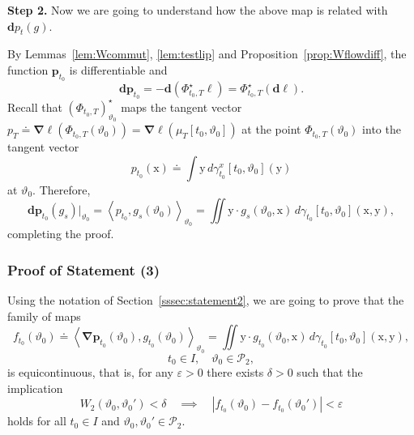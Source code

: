 \documentclass[sn-mathphys-num]{sn-jnl}
\numberwithin{equation}{section}
\theoremstyle{mythm}
\theoremstyle{mydef}
\renewcommand{\d}{\,d}
\renewcommand{\mathbf}[1]{\bm{#1}}
\begin{document}
\textbf{Step 2.} Now we are going to understand how the above map is related with \( \mathbf{d}p_t(g) \).

By Lemmas~\ref{lem:Wcommut}, \ref{lem:testlip} and Proposition~\ref{prop:Wflowdiff}, the function \( \mathbf{p}_{t_0} \) is differentiable and
  \[
    \mathbf{d}\mathbf{p}_{t_0} = - \mathbf{d}\left(\Phi_{t_0,T}^{\star}\ell\right) = \Phi_{t_0,T}^{\star}(\mathbf{d}\ell).
  \]
  Recall that \( (\Phi_{t_0,T})^{\star}_{\vartheta_0} \) maps the tangent vector \( p_T \doteq \bm \nabla\ell(\Phi_{t_0,T}(\vartheta_0)) = \bm \nabla\ell(\mu_{T}[t_0,\vartheta_0]) \) at the point \( \Phi_{t_0,T}(\vartheta_0) \) into the tangent vector
  \[
    p_{t_0}(\mathrm{x}) \doteq \int \mathrm{y}\d \gamma_{t_0}^x[t_0,\vartheta_0](\mathrm{y})
  \]
  at \( \vartheta_0 \).
  Therefore,
\[
  \bm d \mathbf{p}_{t_0}(g_s)\big|_{\vartheta_0} = \left< p_{t_0},g_s(\vartheta_0) \right>_{\vartheta_0} =
  \iint \mathrm{y}\cdot g_s(\vartheta_0,\mathrm{x})\d \gamma_{t_0}[t_0,\vartheta_0](\mathrm{x},\mathrm{y}),
\]
completing the proof.

\subsubsection{Proof of Statement (3)}
\label{sssec:statement3}

Using the notation of Section~\ref{sssec:statement2}, we are going to prove that the family of maps
  \[
    f_{t_0}(\vartheta_0) \doteq \left< \bm \nabla \mathbf{p}_{t_0}(\vartheta_0), g_{t_0}(\vartheta_0) \right>_{\vartheta_0} = \iint \mathrm{y}\cdot g_{t_0}(\vartheta_0,\mathrm{x})\d \gamma_{t_0}[t_0,\vartheta_0](\mathrm{x},\mathrm{y}),
    \]
    \[
    t_0\in I,\quad  \vartheta_0\in \mathcal{P}_2,
  \]
  is equicontinuous, that is, for any \( \varepsilon>0 \) there exists \( \delta>0 \) such that the implication
  \[
    W_2(\vartheta_0,\vartheta_0')<\delta \quad \implies \quad |f_{t_0}(\vartheta_0)-f_{t_0}(\vartheta_0')|<\varepsilon
  \]
  holds for all \( t_0\in I \) and \( \vartheta_0,\vartheta_0'\in \mathcal{P}_2 \).
\end{document}
